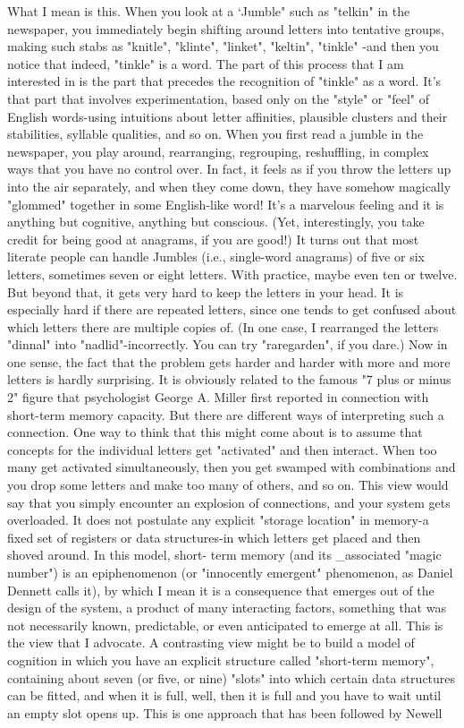        What I mean is this. When you look at a `Jumble" such as "telkin" in the
newspaper, you immediately begin shifting around letters into tentative groups,
making such stabs as "knitle", "klinte", "linket", "keltin", "tinkle" -and then you notice
that indeed, "tinkle" is a word. The part of this process that I am interested in is the
part that precedes the recognition of "tinkle" as a word. It's that part that involves
experimentation, based only on the "style" or "feel" of English words-using intuitions
about letter affinities, plausible clusters and their stabilities, syllable qualities, and so
on. When you first read a jumble in the newspaper, you play around, rearranging,
regrouping, reshuffling, in complex ways that you have no control over. In fact, it
feels as if you throw the letters up into the air separately, and when they come down,
they have somehow magically "glommed" together in some English-like word! It's a
marvelous feeling and it is anything but cognitive, anything but conscious. (Yet,
interestingly, you take credit for being good at anagrams, if you are good!)
        It turns out that most literate people can handle Jumbles (i.e., single-word
anagrams) of five or six letters, sometimes seven or eight letters. With practice,
maybe even ten or twelve. But beyond that, it gets very hard to keep the letters in your
head. It is especially hard if there are repeated letters, since one tends to get confused
about which letters there are multiple copies of. (In one case, I rearranged the letters
"dinnal" into "nadlid"-incorrectly. You can try "raregarden", if you dare.) Now in one
sense, the fact that the problem gets harder and harder with more and more letters is
hardly surprising. It is obviously related to the famous "7 plus or minus 2" figure that
psychologist George A. Miller first reported in connection with short-term memory
capacity. But there are different ways of interpreting such a connection.
        One way to think that this might come about is to assume that concepts for the
individual letters get "activated" and then interact. When too many get activated
simultaneously, then you get swamped with combinations and you drop some letters
and make too many of others, and so on. This view would say that you simply
encounter an explosion of connections, and your system gets overloaded. It does not
postulate any explicit "storage location" in memory-a fixed set of registers or data
structures-in which letters get placed and then shoved around. In this model, short-
term memory (and its \_associated "magic number") is an epiphenomenon (or
"innocently emergent" phenomenon, as Daniel Dennett calls it), by which I mean it is
a consequence that emerges out of the design of the system, a product of many
interacting factors, something that was not necessarily known, predictable, or even
anticipated to emerge at all. This is the view that I advocate.
        A contrasting view might be to build a model of cognition in which you have
an explicit structure called "short-term memory", containing about seven (or five, or
nine) "slots" into which certain data structures can be fitted, and when it is full, well,
then it is full and you have to wait until an empty slot opens up. This is one approach
that has been followed by Newell




